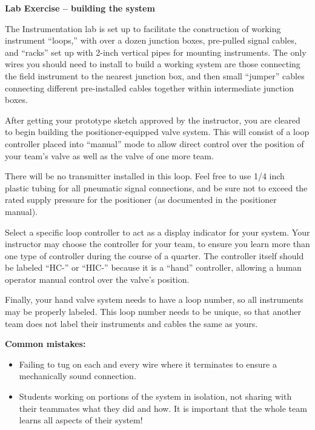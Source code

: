 \documentclass[12pt,a4paper]{article}
\begin{document}
\begin{itemize}
\vfil \eject

\noindent
{\bf Lab Exercise -- building the system}

\vskip 5pt

The Instrumentation lab is set up to facilitate the construction of working instrument ``loops,'' with over a dozen junction boxes, pre-pulled signal cables, and ``racks'' set up with 2-inch vertical pipes for mounting instruments.  The only wires you should need to install to build a working system are those connecting the field instrument to the nearest junction box, and then small ``jumper'' cables connecting different pre-installed cables together within intermediate junction boxes.

After getting your prototype sketch approved by the instructor, you are cleared to begin building the positioner-equipped valve system.  This will consist of a loop controller placed into ``manual'' mode to allow direct control over the position of your team's valve as well as the valve of one more team.  

There will be no transmitter installed in this loop.  Feel free to use 1/4 inch plastic tubing for all pneumatic signal connections, and be sure not to exceed the rated supply pressure for the positioner (as documented in the positioner manual).

Select a specific loop controller to act as a display indicator for your system.  Your instructor may choose the controller for your team, to ensure you learn more than one type of controller during the course of a quarter.  The controller itself should be labeled ``HC-'' or ``HIC-'' because it is a ``hand'' controller, allowing a human operator manual control over the valve's position. 

Finally, your hand valve system needs to have a loop number, so all instruments may be properly labeled.  This loop number needs to be unique, so that another team does not label their instruments and cables the same as yours.  

\vskip 10pt

{\bf Common mistakes:}

\begin{itemize}
\item{} Failing to tug on each and every wire where it terminates to ensure a mechanically sound connection.
\item{} Students working on portions of the system in isolation, not sharing with their teammates what they did and how.  It is important that the whole team learns all aspects of their system!
\end{itemize}


\end{itemize}
\end{document}
